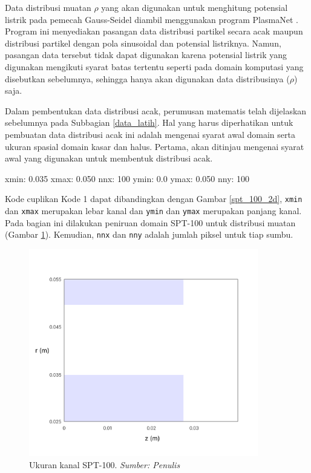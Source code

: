 Data distribusi muatan $\rho$ yang akan digunakan untuk menghitung potensial
listrik pada pemecah Gauss-Seidel diambil menggunakan program PlasmaNet \citep{cheng_illarramendi_bauerheim_cuenot_2021}.
Program ini menyediakan pasangan data distribusi partikel secara acak maupun
distribusi partikel dengan pola sinusoidal dan potensial listriknya. Namun,
pasangan data tersebut tidak dapat digunakan karena potensial listrik yang
digunakan mengikuti syarat batas tertentu seperti pada domain komputasi yang
disebutkan sebelumnya, sehingga hanya akan digunakan data distribusinya ($\rho$)
saja.

Dalam pembentukan data distribusi acak, perumusan matematis telah dijelaskan
sebelumnya pada Subbagian \ref{data_latih}. Hal yang harus diperhatikan untuk pembuatan
data distribusi acak ini adalah mengenai syarat awal domain serta ukuran spasial
domain kasar dan halus. Pertama, akan ditinjau mengenai syarat awal yang digunakan
untuk membentuk distribusi acak.

\begin{mypythoncode}
   xmin: 0.035 xmax: 0.050
  nnx: 100 ymin: 0.0 ymax: 0.050 nny: 100
\end{mypythoncode}

Kode cuplikan Kode 1 dapat dibandingkan dengan Gambar \ref{spt_100_2d}, \texttt{xmin}
dan \texttt{xmax} merupakan lebar kanal dan \texttt{ymin} dan \texttt{ymax} merupakan
panjang kanal. Pada bagian ini dilakukan peniruan domain SPT-100 untuk
distribusi muatan (Gambar \ref{ukuran spt 100}). Kemudian, \texttt{nnx} dan \texttt{nny}
adalah jumlah piksel untuk tiap sumbu.

\begin{figure}[h!]
  \centering
  \includegraphics[width=10cm]{gambar/domain spt100 ukuran.png}
  \caption{Ukuran kanal SPT-100. \emph{ Sumber: Penulis}}
  \label{ukuran spt 100}
\end{figure}

